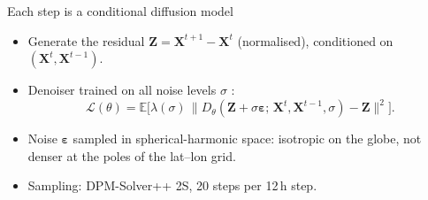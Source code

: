 \documentclass[aspectratio=169,11pt]{beamer}
\newcommand{\verify}[1]{\colorbox{yellow!50}{#1}}
\newcommand{\X}{\mathbf{X}}
\begin{document}
\begin{frame}{Each step is a conditional diffusion model}
  \begin{itemize}
    \item Generate the \alert{residual} $\mathbf{Z} = \X^{t+1} - \X^{t}$ \verify{(normalised)}, conditioned on $(\X^{t}, \X^{t-1})$.
    \item Denoiser trained on all noise levels $\sigma$ \citep[EDM-style,][]{karras2022edm}:
      \[
        \mathcal{L}(\theta) = \mathbb{E}\Big[\lambda(\sigma)\,\big\| D_\theta(\mathbf{Z}+\sigma\bm{\varepsilon};\,\X^{t},\X^{t-1},\sigma) - \mathbf{Z}\big\|^2\Big].
      \]
    \item Noise $\bm{\varepsilon}$ sampled in \alert{spherical-harmonic} space: isotropic on the globe, not denser at the poles of the lat--lon grid.
    \item Sampling: \verify{DPM-Solver++ 2S, 20 steps} per 12\,h step.
  \end{itemize}
\end{frame}
\end{document}
